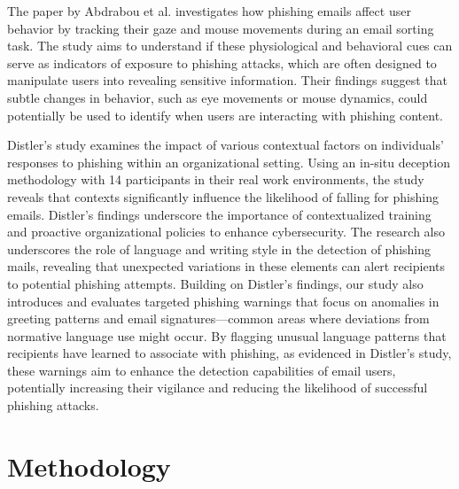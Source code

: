 \documentclass[
  a4paper,  %
  twoside,  %
  bibliography=totoc,
  headsepline,
  cleardoublepage=empty,
  parskip=half,
  draft=false
]{scrbook}
\begin{document}
The paper by Abdrabou et al. \cite{abdrabou} investigates how phishing emails affect user behavior by tracking their gaze and mouse movements during an email sorting task. The study aims to understand if these physiological and behavioral cues can serve as indicators of exposure to phishing attacks, which are often designed to manipulate users into revealing sensitive information. Their findings suggest that subtle changes in behavior, such as eye movements or mouse dynamics, could potentially be used to identify when users are interacting with phishing content. 

Distler's study \cite{distler} examines the impact of various contextual factors on individuals' responses to phishing within an organizational setting. Using an in-situ deception methodology with 14 participants in their real work environments, the study reveals that contexts significantly influence the likelihood of falling for phishing emails. Distler's findings underscore the importance of contextualized training and proactive organizational policies to enhance cybersecurity.  The research also underscores the role of language and writing style in the detection of phishing mails, revealing that unexpected variations in these elements can alert recipients to potential phishing attempts. \newline 
Building on Distler's findings, our study also introduces and evaluates targeted phishing warnings that focus on anomalies in greeting patterns and email signatures—common areas where deviations from normative language use might occur.  By flagging unusual language patterns that recipients have learned to associate with phishing, as evidenced in Distler’s study, these warnings aim to enhance the detection capabilities of email users, potentially increasing their vigilance and reducing the likelihood of successful phishing attacks. 


\chapter{Methodology}
\label{sec:methodology}
\end{document}
